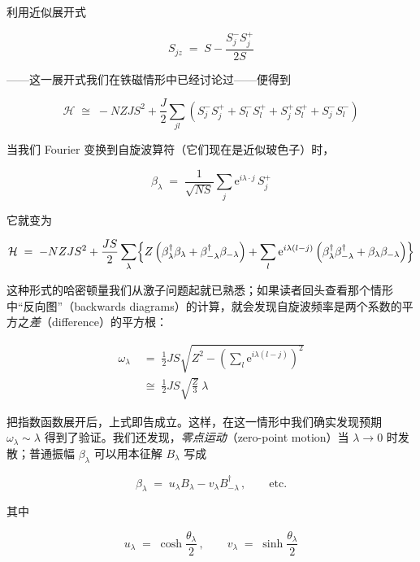 利用近似展开式

\begin{equation*}
S_{jz} \;=\; S - \frac{S_j^- S_j^+}{2S}
\end{equation*}

——这一展开式我们在铁磁情形中已经讨论过——便得到

\begin{equation*}
\mathcal{H} \;\cong\; -NZJS^2 + \frac{J}{2}\sum_{jl}\left(S_j^- S_j^+ + S_l^- S_l^+ + S_j^+ S_l^+ + S_j^- S_l^-\right)
\end{equation*}

当我们 Fourier 变换到自旋波算符（它们现在是近似玻色子）时，

\begin{equation*}
\beta_\lambda \;=\; \frac{1}{\sqrt{NS}}\sum_j \mathrm{e}^{i\lambda\cdot j}\, S_j^+
\end{equation*}

它就变为

\begin{equation*}
\mathcal{H} \;=\; -NZJS^2 + \frac{JS}{2}\sum_\lambda \Bigl\{ Z\left(\beta_\lambda^\dagger\beta_\lambda + \beta_{-\lambda}^\dagger\beta_{-\lambda}\right) + \sum_l \mathrm{e}^{i\lambda(l-j)}\left(\beta_\lambda^\dagger\beta_{-\lambda}^\dagger + \beta_\lambda\beta_{-\lambda}\right)\Bigr\}
\end{equation*}

这种形式的哈密顿量我们从激子问题起就已熟悉；如果读者回头查看那个情形中“反向图”（backwards diagrams）的计算，就会发现自旋波频率是两个系数的平方之\emph{差}（difference）的平方根：

\begin{align*}
\omega_\lambda \;&=\; \frac{1}{2}JS\sqrt{Z^2 - \left(\sum_l \mathrm{e}^{i\lambda(l-j)}\right)^2}\\
&\cong\; \frac{1}{2}JS\sqrt{\frac{Z}{3}}\ \lambda
\end{align*}

把指数函数展开后，上式即告成立。这样，在这一情形中我们确实发现预期 $\omega_\lambda\sim\lambda$ 得到了验证。我们还发现，\emph{零点运动}（zero-point motion）当 $\lambda\to 0$ 时发散；普通振幅 $\beta_\lambda$ 可以用本征解 $B_\lambda$ 写成

\begin{equation*}
\beta_\lambda \;=\; u_\lambda B_\lambda - v_\lambda B_{-\lambda}^\dagger\,,\qquad \text{etc.}
\end{equation*}

其中

\begin{equation*}
u_\lambda \;=\; \cosh\frac{\theta_\lambda}{2}\,,\qquad v_\lambda \;=\; \sinh\frac{\theta_\lambda}{2}
\end{equation*}

